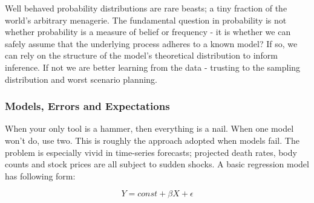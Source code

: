 \documentclass[10pt,a4paper,notitlepage, twocolumn]{article}
\begin{document}
Well behaved probability distributions are rare beasts; a tiny fraction of the world's arbitrary menagerie. The fundamental question in probability is not whether probability is a measure of belief or frequency - it is whether we can safely assume that the underlying process adheres to a known model? If so, we can rely on the structure of the model's theoretical distribution to inform inference. If not we are better learning from the data - trusting to the sampling distribution and worst scenario planning.

\subsubsection*{Models, Errors and Expectations}
When your only tool is a hammer, then everything is a nail. When one model won't do, use two. This is roughly the approach adopted when models fail. The problem is especially vivid in time-series forecasts; projected death rates, body counts and stock prices are all subject to sudden shocks. A basic regression model has following form:

$$ Y = const + \beta X + \epsilon $$
\end{document}
